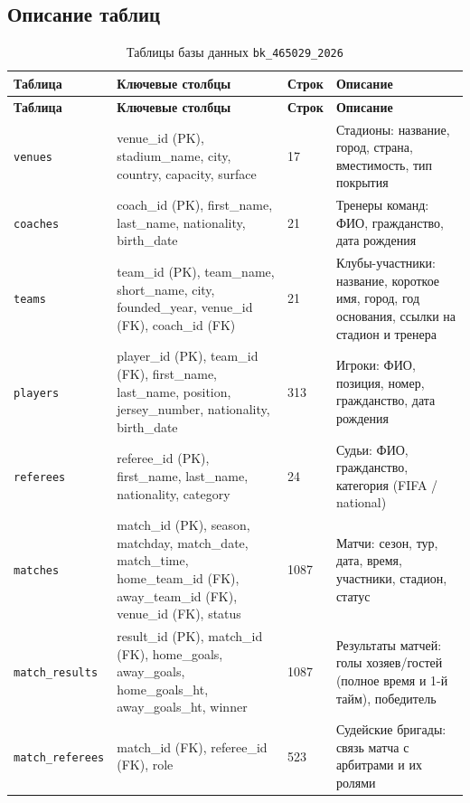 \documentclass[14pt,a4paper]{extarticle}
\begin{document}
\subsection{Описание таблиц}

\begin{longtable}{|p{3.5cm}|p{3.5cm}|p{2cm}|p{5.5cm}|}
  \caption{Таблицы базы данных \texttt{bk\_465029\_2026}}
  \label{tab:tables}\\
  \hline
  \textbf{Таблица} & \textbf{Ключевые столбцы} & \textbf{Строк} & \textbf{Описание} \\
  \hline
  \endfirsthead
  \hline
  \textbf{Таблица} & \textbf{Ключевые столбцы} & \textbf{Строк} & \textbf{Описание} \\
  \hline
  \endhead
  \hline
  \endfoot

  \texttt{venues} &
  venue\_id (PK), stadium\_name, city, country, capacity, surface &
  17 &
  Стадионы: название, город, страна, вместимость, тип покрытия \\
  \hline

  \texttt{coaches} &
  coach\_id (PK), first\_name, last\_name, nationality, birth\_date &
  21 &
  Тренеры команд: ФИО, гражданство, дата рождения \\
  \hline

  \texttt{teams} &
  team\_id (PK), team\_name, short\_name, city, founded\_year, venue\_id (FK), coach\_id (FK) &
  21 &
  Клубы-участники: название, короткое имя, город, год основания, ссылки на стадион и тренера \\
  \hline

  \texttt{players} &
  player\_id (PK), team\_id (FK), first\_name, last\_name, position, jersey\_number, nationality, birth\_date &
  313 &
  Игроки: ФИО, позиция, номер, гражданство, дата рождения \\
  \hline

  \texttt{referees} &
  referee\_id (PK), first\_name, last\_name, nationality, category &
  24 &
  Судьи: ФИО, гражданство, категория (FIFA / national) \\
  \hline

  \texttt{matches} &
  match\_id (PK), season, matchday, match\_date, match\_time, home\_team\_id (FK), away\_team\_id (FK), venue\_id (FK), status &
  1087 &
  Матчи: сезон, тур, дата, время, участники, стадион, статус \\
  \hline

  \texttt{match\_results} &
  result\_id (PK), match\_id (FK), home\_goals, away\_goals, home\_goals\_ht, away\_goals\_ht, winner &
  1087 &
  Результаты матчей: голы хозяев/гостей (полное время и 1-й тайм), победитель \\
  \hline

  \texttt{match\_referees} &
  match\_id (FK), referee\_id (FK), role &
  523 &
  Судейские бригады: связь матча с арбитрами и их ролями \\
  \hline

\end{longtable}
\end{document}

